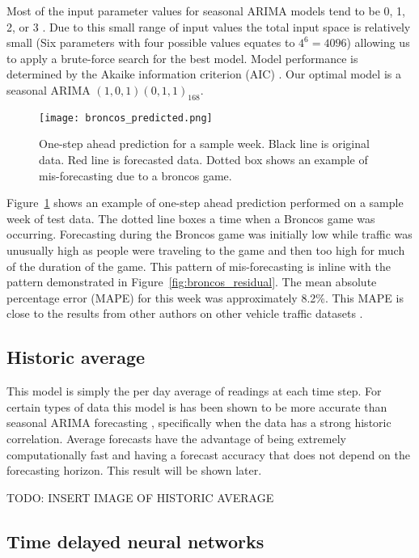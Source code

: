 Most of the input parameter values for seasonal ARIMA models tend to be 0, 1, 2, or 3 \cite{Box2008}.  Due to this small range of input values the total input space is relatively small (Six parameters with four possible values equates to $4^6 = 4096$) allowing us to apply a brute-force search for the best model.  Model performance is determined by the Akaike information criterion (AIC) \cite{Akaike1974}.  Our optimal model is a seasonal ARIMA $(1,0,1)(0,1,1)_{168}$.  

\begin{figure}[h]
\begin{center}
\texttt{[image: broncos\_predicted.png]}
\end{center}
\caption{One-step ahead prediction for a sample week.  Black line is original data.  Red line is forecasted data.  Dotted box shows an example of mis-forecasting due to a broncos game.}
\label{fig:arima_prediction}
\end{figure}

Figure~\ref{fig:arima_prediction} shows an example of one-step ahead prediction performed on a sample week of test data.  The dotted line boxes a time when a Broncos game was occurring.  Forecasting during the Broncos game was initially low while traffic was unusually high as people were traveling to the game and then too high for much of the duration of the game.  This pattern of mis-forecasting is inline with the pattern demonstrated in Figure~\ref{fig:broncos_residual}.  The mean absolute percentage error (MAPE) for this week was approximately 8.2\%.  This MAPE is close to the results from other authors on other vehicle traffic datasets \cite{Williams2003,Smith1997}.  



\subsection{Historic average}
This model is simply the per day average of readings at each time step.  For certain types of data this model is has been shown to be more accurate than seasonal ARIMA forecasting \cite{Newsham2010}, specifically when the data has a strong historic correlation.  Average forecasts have the advantage of being extremely computationally fast and having a forecast accuracy that does not depend on the forecasting horizon.  This result will be shown later.

TODO: INSERT IMAGE OF HISTORIC AVERAGE

\subsection{Time delayed neural networks}

